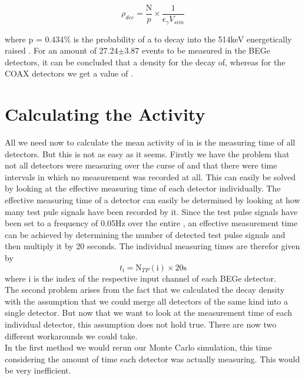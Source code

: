 \documentclass[encoding=utf8,british]{tumphthesis}
\begin{document}
\begin{equation}
\rho_{dec} = \frac{\mathrm{N}}{p}\times\frac{1}{\epsilon_\gamma V_{sim}}
\label{equ:density}
\end{equation}

where p = 0.434$\%$ is the probability of a \Kr to decay into the 514keV energetically raised .
For an amount of 27.24\(\pm\)3.87 events to be measured in the BEGe detectors, it can be concluded that a density for the \Kr decay of, whereas for the COAX detectors we get a value of . 
\\


\section{Calculating the Activity}
\label{sec:CalcActiv}

All we need now to calculate the mean activity of \Kr in \PII is the measuring time of all detectors.
But this is not as easy as it seems.
Firstly we have the problem that not all detectors were measuring over the curse of \PII and that there were time intervals in which no measurement was recorded at all.
This can easily be solved by looking at the effective measuring time of each detector individually.
The effective measuring time of a detector can easily be determined by looking at how many test pule signals have been recorded by it. 
Since the test pulse signals have been set to a frequency of 0.05Hz over the entire \PII, an effective measurement time can be achieved by determining the number of detected test pulse signals and then multiply it by 20 seconds.
The individual measuring times are therefor given by
\begin{equation*}
    t_\mathrm{i} = \mathrm{N}_{TP}(\mathrm{i}) \times 20\mathrm{s}
\end{equation*}
where i is the index of the respective input channel of each BEGe detector.
\\

The second problem arises from the fact that we calculated the decay density with the assumption that we could merge all detectors of the same kind into a single detector.
But now that we want to look at the measurement time of each individual detector, this assumption does not hold true.
There are now two different workarounds we could take.
\\

In the first method we would rerun our Monte Carlo simulation, this time considering the amount of time each detector was actually measuring.
This would be very inefficient.
\\
\end{document}
